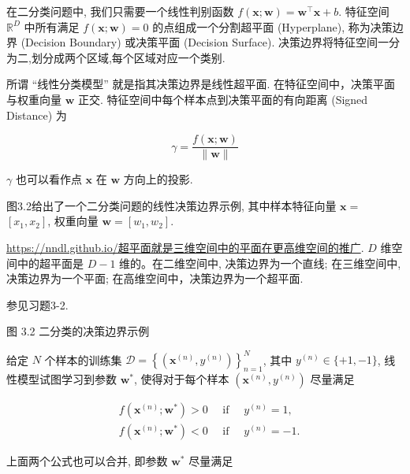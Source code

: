 \documentclass[10pt]{article}
\begin{document}
在二分类问题中, 我们只需要一个线性判别函数 $f(\boldsymbol{x} ; \boldsymbol{w})=\boldsymbol{w}^{\top} \boldsymbol{x}+b$. 特征空间 $\mathbb{R}^{D}$ 中所有满足 $f(\boldsymbol{x} ; \boldsymbol{w})=0$ 的点组成一个分割超平面 (Hyperplane), 称为决策边界 (Decision Boundary) 或决策平面 (Decision Surface). 决策边界将特征空间一分为二,划分成两个区域,每个区域对应一个类别.

所谓 “线性分类模型” 就是指其决策边界是线性超平面. 在特征空间中，决策平面与权重向量 $\boldsymbol{w}$ 正交. 特征空间中每个样本点到决策平面的有向距离 (Signed Distance) 为


\begin{equation*}
\gamma=\frac{f(\boldsymbol{x} ; \boldsymbol{w})}{\|\boldsymbol{w}\|} \tag{3.6}
\end{equation*}


$\gamma$ 也可以看作点 $\boldsymbol{x}$ 在 $\boldsymbol{w}$ 方向上的投影.

图3.2给出了一个二分类问题的线性决策边界示例, 其中样本特征向量 $\boldsymbol{x}=$ $\left[x_{1}, x_{2}\right]$, 权重向量 $\boldsymbol{w}=\left[w_{1}, w_{2}\right]$.

\href{https://nndl.github.io/%E8%B6%85%E5%B9%B3%E9%9D%A2%E5%B0%B1%E6%98%AF%E4%B8%89%E7%BB%B4%E7%A9%BA%E9%97%B4%E4%B8%AD%E7%9A%84%E5%B9%B3%E9%9D%A2%E5%9C%A8%E6%9B%B4%E9%AB%98%E7%BB%B4%E7%A9%BA%E9%97%B4%E7%9A%84%E6%8E%A8%E5%B9%BF}{https://nndl.github.io/超平面就是三维空间中的平面在更高维空间的推广}. $D$ 维空间中的超平面是 $D-1$ 维的。在二维空间中, 决策边界为一个直线; 在三维空间中, 决策边界为一个平面; 在高维空间中，决策边界为一个超平面.

参见习题3-2.



图 3.2 二分类的决策边界示例

给定 $N$ 个样本的训练集 $\mathcal{D}=\left\{\left(\boldsymbol{x}^{(n)}, y^{(n)}\right)\right\}_{n=1}^{N}$, 其中 $y^{(n)} \in\{+1,-1\}$, 线性模型试图学习到参数 $\boldsymbol{w}^{*}$, 使得对于每个样本 $\left(\boldsymbol{x}^{(n)}, y^{(n)}\right)$ 尽量满足

$$
\begin{aligned}
& f\left(\boldsymbol{x}^{(n)} ; \boldsymbol{w}^{*}\right)>0 \quad \text { if } \quad y^{(n)}=1 \text {, } \\
& f\left(\boldsymbol{x}^{(n)} ; \boldsymbol{w}^{*}\right)<0 \quad \text { if } \quad y^{(n)}=-1 .
\end{aligned}
$$

上面两个公式也可以合并, 即参数 $\boldsymbol{w}^{*}$ 尽量满足
\end{document}
